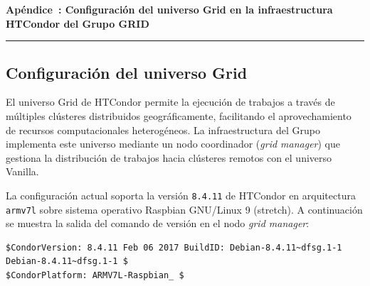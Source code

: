 
{}


\vspace{40pt}

{\centering \normalfont\huge\bfseries Apéndice~\thechapter: Configuración del universo Grid en la infraestructura HTCondor del Grupo GRID~\par}

\vspace{10pt}

{\centering \rule{\textwidth}{0.4pt} \par}

\vspace{40pt}


\FloatBarrier\subsection{Configuración del universo Grid}

El universo Grid de HTCondor permite la ejecución de trabajos a través de múltiples clústeres distribuidos geográficamente, facilitando el aprovechamiento de recursos computacionales heterogéneos. La infraestructura del Grupo \GRID implementa este universo mediante un nodo coordinador (\textit{grid manager}) que gestiona la distribución de trabajos hacia clústeres remotos con el universo Vanilla.

La configuración actual soporta la versión \texttt{8.4.11} de HTCondor en arquitectura \texttt{armv7l} sobre sistema operativo Raspbian GNU/Linux 9 (stretch). A continuación se muestra la salida del comando de versión en el nodo \textit{grid manager}:

\begin{verbatim}
$CondorVersion: 8.4.11 Feb 06 2017 BuildID: Debian-8.4.11~dfsg.1-1 Debian-8.4.11~dfsg.1-1 $
$CondorPlatform: ARMV7L-Raspbian_ $
\end{verbatim}


